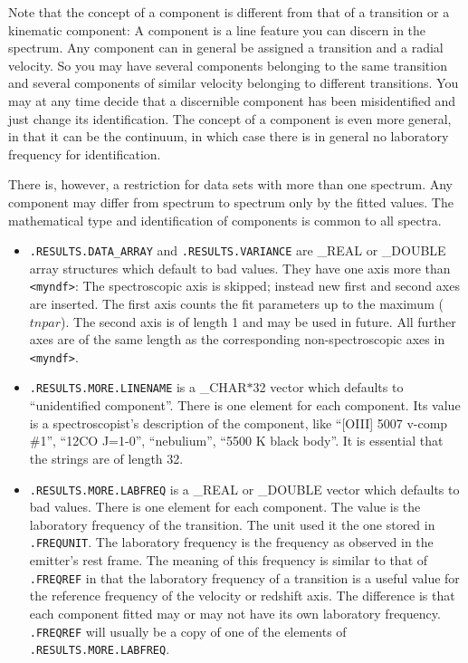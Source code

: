 \begin{itemize}
Note that the concept of a component is different from that of a transition or
a kinematic component: A component is a line feature you can discern in the
spectrum. Any component can in general be assigned a transition and a radial
velocity. So you may have several components belonging to the same transition
and several components of similar velocity belonging to different transitions.
You may at any time decide that a discernible component has been misidentified
and just change its identification. The concept of a component is even more
general, in that it can be the continuum, in which case there is in general no
laboratory frequency for identification.

There is, however, a restriction for data sets with more than one spectrum. Any
component may differ from spectrum to spectrum only by the fitted values. The
mathematical type and identification of components is common to all spectra.

\begin{itemize}
\item{\tt .RESULTS.DATA\_ARRAY} and {\tt .RESULTS.VARIANCE} are \_REAL
or \_DOUBLE array structures which default to bad values. They have one axis
more than {\tt <myndf>}: The spectroscopic axis is skipped; instead new first and
second axes are inserted. The first axis counts the fit parameters up to the
maximum ($tnpar$). The second axis is of length 1 and may be used in future.
All further axes are of the same length as the
corresponding non-spectroscopic axes in {\tt <myndf>}.

\item{\tt .RESULTS.MORE.LINENAME} is a \_CHAR$*$32 vector which defaults to
``unidentified component''. There is one element for each component. Its value
is a spectroscopist's description of the component, like ``[OIII] 5007 v-comp
\#1'', ``12CO J=1-0'', ``nebulium'', ``5500 K black body''. It is essential
that the strings are of length 32.

\item{\tt .RESULTS.MORE.LABFREQ} is a \_REAL or \_DOUBLE vector which
defaults to bad values. There is one element for each component. The value is
the laboratory frequency of the transition. The unit used it the one stored in
{\tt .FREQUNIT}. The laboratory frequency is the frequency as observed in the
emitter's rest frame. The meaning of this frequency is similar to that of {\tt
.FREQREF} in that the laboratory frequency of a transition is a useful value
for the reference frequency of the velocity or redshift axis. The difference is
that each component fitted may or may not have its own laboratory frequency.
{\tt .FREQREF} will usually be a copy of one of the elements of {\tt
.RESULTS.MORE.LABFREQ}.


\end{itemize}
\end{itemize}
